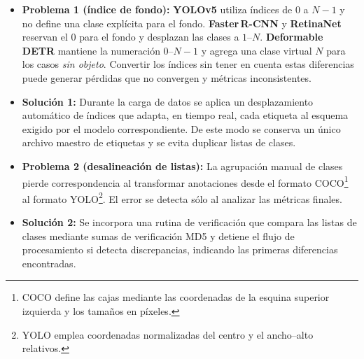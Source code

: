 \begin{itemize}
  \item \textbf{Problema 1 (índice de fondo):}
        \textbf{YOLOv5} utiliza índices de \(0\) a \(N-1\) y no define una clase explícita para el fondo.
        \textbf{Faster\,R-CNN} y \textbf{RetinaNet} reservan el \(0\) para el fondo y desplazan las clases a \(1\)–\(N\).
        \textbf{Deformable DETR} mantiene la numeración \(0\)–\(N-1\) y agrega una clase virtual \(N\) para los casos \emph{sin objeto}.
        Convertir los índices sin tener en cuenta estas diferencias puede generar pérdidas que no convergen y métricas inconsistentes.

  \item \textbf{Solución 1:}
        Durante la carga de datos se aplica un desplazamiento automático de índices que adapta, en tiempo real, cada etiqueta al esquema exigido por el modelo correspondiente.
        De este modo se conserva un único archivo maestro de etiquetas y se evita duplicar listas de clases.

  \item \textbf{Problema 2 (desalineación de listas):}
        La agrupación manual de clases pierde correspondencia al transformar anotaciones desde el formato COCO\footnote{COCO define las cajas mediante las coordenadas de la esquina superior izquierda y los tamaños en píxeles.} al formato YOLO\footnote{YOLO emplea coordenadas normalizadas del centro y el ancho–alto relativos.}.
        El error se detecta sólo al analizar las métricas finales.

  \item \textbf{Solución 2:}
        Se incorpora una rutina de verificación que compara las listas de clases mediante sumas de verificación MD5 y detiene el flujo de procesamiento si detecta discrepancias, indicando las primeras diferencias encontradas.
\end{itemize}

